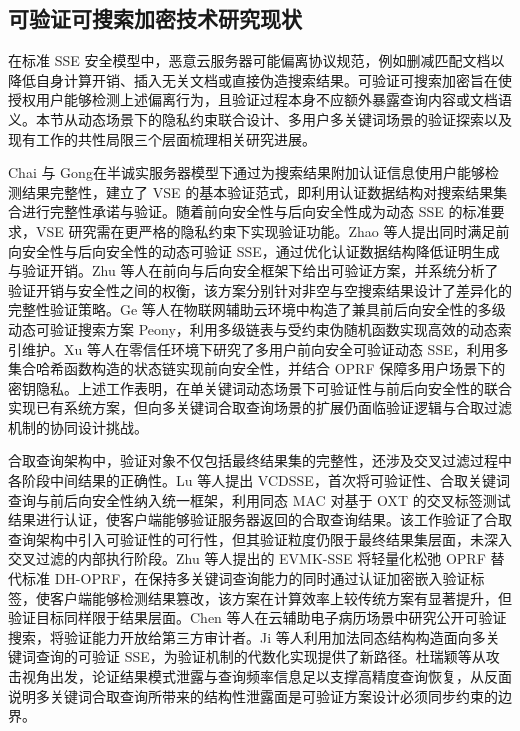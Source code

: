 \subsection{可验证可搜索加密技术研究现状}

在标准 SSE 安全模型中，恶意云服务器可能偏离协议规范，例如删减匹配文档以降低自身计算开销、插入无关文档或直接伪造搜索结果。可验证可搜索加密旨在使授权用户能够检测上述偏离行为，且验证过程本身不应额外暴露查询内容或文档语义。本节从动态场景下的隐私约束联合设计、多用户多关键词场景的验证探索以及现有工作的共性局限三个层面梳理相关研究进展。

Chai 与 Gong\cite{6364125}在半诚实服务器模型下通过为搜索结果附加认证信息使用户能够检测结果完整性，建立了 VSE 的基本验证范式，即利用认证数据结构对搜索结果集合进行完整性承诺与验证。随着前向安全性与后向安全性成为动态 SSE 的标准要求，VSE 研究需在更严格的隐私约束下实现验证功能。Zhao 等人\cite{10700724}提出同时满足前向安全性与后向安全性的动态可验证 SSE，通过优化认证数据结构降低证明生成与验证开销。Zhu 等人\cite{10812908}在前向与后向安全框架下给出可验证方案，并系统分析了验证开销与安全性之间的权衡，该方案分别针对非空与空搜索结果设计了差异化的完整性验证策略。Ge 等人\cite{10674000}在物联网辅助云环境中构造了兼具前后向安全性的多级动态可验证搜索方案 Peony，利用多级链表与受约束伪随机函数实现高效的动态索引维护。Xu 等人\cite{10.1016/j.future.2024.107701}在零信任环境下研究了多用户前向安全可验证动态 SSE，利用多集合哈希函数构造的状态链实现前向安全性，并结合 OPRF 保障多用户场景下的密钥隐私。上述工作表明，在单关键词动态场景下可验证性与前后向安全性的联合实现已有系统方案，但向多关键词合取查询场景的扩展仍面临验证逻辑与合取过滤机制的协同设计挑战。

合取查询架构中，验证对象不仅包括最终结果集的完整性，还涉及交叉过滤过程中各阶段中间结果的正确性。Lu 等人\cite{10.1093/comjnl/bxac084}提出 VCDSSE，首次将可验证性、合取关键词查询与前后向安全性纳入统一框架，利用同态 MAC 对基于 OXT 的交叉标签测试结果进行认证，使客户端能够验证服务器返回的合取查询结果。该工作验证了合取查询架构中引入可验证性的可行性，但其验证粒度仍限于最终结果集层面，未深入交叉过滤的内部执行阶段。Zhu 等人\cite{zhu2025evmk}提出的 EVMK-SSE 将轻量化松弛 OPRF 替代标准 DH-OPRF，在保持多关键词查询能力的同时通过认证加密嵌入验证标签，使客户端能够检测结果篡改，该方案在计算效率上较传统方案有显著提升，但验证目标同样限于结果层面。Chen 等人\cite{10123958}在云辅助电子病历场景中研究公开可验证搜索，将验证能力开放给第三方审计者。Ji 等人\cite{10827839}利用加法同态结构构造面向多关键词查询的可验证 SSE，为验证机制的代数化实现提供了新路径。杜瑞颖等\cite{杜瑞颖2024面向连接关键词可搜索加密的查询恢复攻击}从攻击视角出发，论证结果模式泄露与查询频率信息足以支撑高精度查询恢复，从反面说明多关键词合取查询所带来的结构性泄露面是可验证方案设计必须同步约束的边界。

